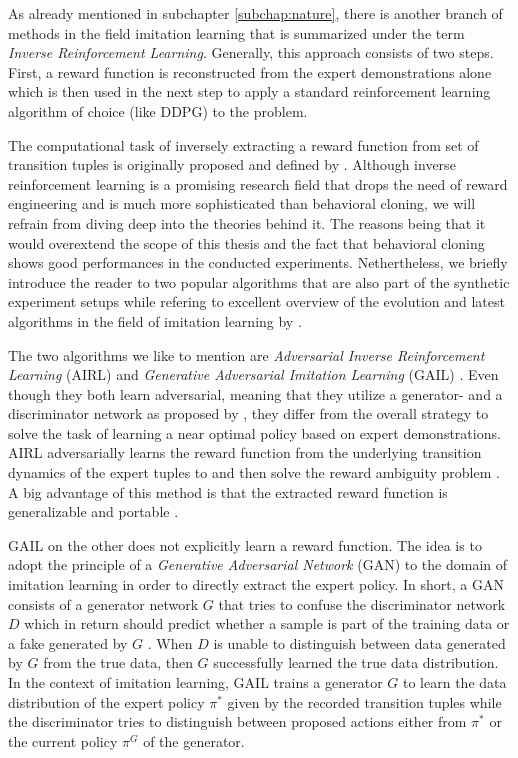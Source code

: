 As already mentioned in subchapter \ref{subchap:nature}, there is another branch of methods in the field imitation learning that is summarized under the term \textit{Inverse Reinforcement Learning}. Generally, this approach consists of two steps. First, a reward function is reconstructed from the expert demonstrations alone which is then used in the next step to apply a standard reinforcement learning algorithm of choice (like DDPG) to the problem.
\par
The computational task of inversely extracting a reward function from set of transition tuples is originally proposed and defined by \cite{russell1998learning}. Although inverse reinforcement learning is a promising research field that drops the need of reward engineering and is much more sophisticated than behavioral cloning, we will refrain from diving deep into the theories behind it. The reasons being that it would overextend the scope of this thesis and the fact that behavioral cloning shows good performances in the conducted experiments. Nethertheless, we briefly introduce the reader to two popular algorithms that are also part of the synthetic experiment setups while refering to excellent overview of the evolution and latest algorithms in the field of imitation learning by \cite{zheng2021imitation}.
\par
The two algorithms we like to mention are  \textit{Adversarial Inverse Reinforcement Learning} (AIRL) \cite[]{fu2017learning} and \textit{Generative Adversarial Imitation Learning} (GAIL) \cite[]{ho2016generative}. Even though they both learn adversarial, meaning that they utilize a generator- and a discriminator network as proposed by \cite{goodfellow2014generative}, they differ from the overall strategy to solve the task of learning a near optimal policy based on expert demonstrations. AIRL adversarially learns the 
reward function from the underlying transition dynamics of the expert tuples to and then solve the reward ambiguity problem \cite[pp.~4-5]{fu2017learning}. A big advantage of this method is that the extracted reward function is generalizable and portable \cite[p.~1735]{wang2020deep}.
\par
GAIL on the other does not explicitly learn a reward function. The idea is to adopt the principle of a \textit{Generative Adversarial Network} (GAN) to the domain of imitation learning in order to directly extract the expert policy. In short, a GAN consists of a generator network $G$ that tries to confuse the discriminator network $D$ which in return should predict whether a sample is part of the training data or a fake generated by $G$ \cite[p.~1]{goodfellow2014generative}. When $D$ is unable to distinguish between data generated by $G$ from the true data, then $G$ successfully learned the true data distribution. In the context of imitation learning, GAIL trains a generator $G$ to learn the data distribution of the expert policy $\pi^*$ given by the recorded transition tuples while the discriminator tries to distinguish between proposed actions either from $\pi^*$ or the current policy $\pi^G$ of the generator.

